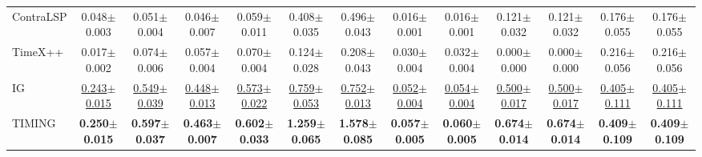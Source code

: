 \documentclass[11pt]{article}
\theoremstyle{plain}
\theoremstyle{definition}
\theoremstyle{remark}
\begin{document}
\begin{table}[h!]
{\begin{tabular}{l|cc|cc|cc|cc|cc|cc}
   ContraLSP & 0.048\scriptsize{$\pm$0.003} & 0.051\scriptsize{$\pm$0.004} & 0.046\scriptsize{$\pm$0.007} & 0.059\scriptsize{$\pm$0.011} & 0.408\scriptsize{$\pm$0.035} & 0.496\scriptsize{$\pm$0.043} & 0.016\scriptsize{$\pm$0.001} & 0.016\scriptsize{$\pm$0.001} & 0.121\scriptsize{$\pm$0.032} & 0.121\scriptsize{$\pm$0.032} & 0.176\scriptsize{$\pm$0.055} & 0.176\scriptsize{$\pm$0.055} \\
   
   TimeX++   & 0.017\scriptsize{$\pm$0.002} & 0.074\scriptsize{$\pm$0.006} & 0.057\scriptsize{$\pm$0.004} & 0.070\scriptsize{$\pm$0.004} & 0.124\scriptsize{$\pm$0.028} & 0.208\scriptsize{$\pm$0.043} & 0.030\scriptsize{$\pm$0.004} & 0.032\scriptsize{$\pm$0.004} & 0.000\scriptsize{$\pm$0.000} & 0.000\scriptsize{$\pm$0.000} & 0.216\scriptsize{$\pm$0.056} & 0.216\scriptsize{$\pm$0.056} \\
   \midrule
   
   IG    & \underline{0.243\scriptsize{$\pm$0.015}} & \underline{0.549\scriptsize{$\pm$0.039}} & \underline{0.448\scriptsize{$\pm$0.013}} & \underline{0.573\scriptsize{$\pm$0.022}} & \underline{0.759\scriptsize{$\pm$0.053}} & \underline{0.752\scriptsize{$\pm$0.013}} & \underline{0.052\scriptsize{$\pm$0.004}} & \underline{0.054\scriptsize{$\pm$0.004}} & \underline{0.500\scriptsize{$\pm$0.017}} & \underline{0.500\scriptsize{$\pm$0.017}} & \underline{0.405\scriptsize{$\pm$0.111}} & \underline{0.405\scriptsize{$\pm$0.111}} \\
   
   \rowcolor{gray!20} TIMING & \textbf{0.250\scriptsize{$\pm$0.015}} & \textbf{0.597\scriptsize{$\pm$0.037}} & \textbf{0.463\scriptsize{$\pm$0.007}} & \textbf{0.602\scriptsize{$\pm$0.033}} & \textbf{1.259\scriptsize{$\pm$0.065}} & \textbf{1.578\scriptsize{$\pm$0.085}} & \textbf{0.057\scriptsize{$\pm$0.005}} & \textbf{0.060\scriptsize{$\pm$0.005}} & \textbf{0.674\scriptsize{$\pm$0.014}} & \textbf{0.674\scriptsize{$\pm$0.014}} & \textbf{0.409\scriptsize{$\pm$0.109}} & \textbf{0.409\scriptsize{$\pm$0.109}} \\

   \bottomrule
\end{tabular}
}
\end{table}
\end{document}
